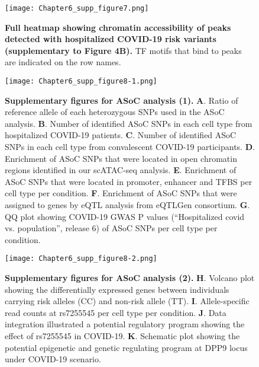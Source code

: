 \documentclass{book}
\begin{document}
\begin{refsection}
\begin{landscape}
  \begin{figure}[!ht]
    \centering
    \texttt{[image: Chapter6\_supp\_figure7.png]}
    \caption{\label{fig:chp6supfig7}
      \textbf{Full heatmap showing chromatin accessibility of peaks detected with hospitalized COVID-19 risk variants (supplementary to Figure 4B).}
      TF motifs that bind to peaks are indicated on the row names.
    }
  \end{figure}

\begin{figure}[!ht]
  \centering
  \texttt{[image: Chapter6\_supp\_figure8-1.png]}
  \caption{\label{fig:chp6supfig8}
    \textbf{Supplementary figures for ASoC analysis (1).}
    \textbf{A}. Ratio of reference allele of each heterozygous SNPs used in the ASoC analysis.
    \textbf{B}. Number of identified ASoC SNPs in each cell type from hospitalized COVID-19 patients.
    \textbf{C}. Number of identified ASoC SNPs in each cell type from convalescent COVID-19 participants.
    \textbf{D}. Enrichment of ASoC SNPs that were located in open chromatin regions identified in our scATAC-seq analysis.
    \textbf{E}. Enrichment of ASoC SNPs that were located in promoter, enhancer and TFBS per cell type per condition.
    \textbf{F}. Enrichment of ASoC SNPs that were assigned to genes by eQTL analysis from eQTLGen consortium.
    \textbf{G}. QQ plot showing COVID-19 GWAS P values (“Hospitalized covid vs. population”, release 6) of ASoC SNPs per cell type per condition.
}
\end{figure}
\end{landscape}

\begin{figure}[!ht]
  \addtocounter{figure}{-1}
  \centering
  \texttt{[image: Chapter6\_supp\_figure8-2.png]}
  \caption{
    \textbf{Supplementary figures for ASoC analysis (2).}
    \textbf{H}. Volcano plot showing the differentially expressed genes between individuals carrying risk alleles (CC) and non-risk allele (TT).
    \textbf{I}. Allele-specific read counts at rs7255545 per cell type per condition.
    \textbf{J}. Data integration illustrated a potential regulatory program showing the effect of rs7255545 in COVID-19.
    \textbf{K}. Schematic plot showing the potential epigenetic and genetic regulating program at DPP9 locus under COVID-19 scenario.
}
\end{figure}


\end{refsection}
\end{document}
